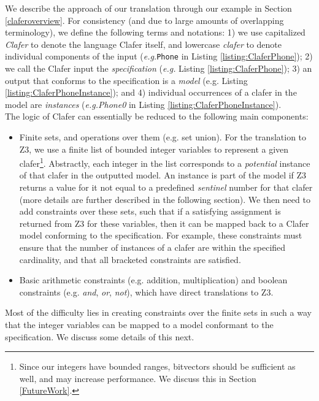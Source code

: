 \documentclass{easychair}
\newcommand{\eg}{\emph{e.g.}\xspace}
\begin{document}
We describe the approach of our translation through our example in Section \ref{claferoverview}. For consistency (and due to large amounts of overlapping terminology), we define the following terms and notations: 1) we use capitalized \textit{Clafer} to denote the language Clafer itself, and lowercase \textit{clafer} to denote individual components of the input (\eg \texttt{Phone} in Listing \ref{listing:ClaferPhone}); 2) we call the Clafer input the \textit{specification} (\eg Listing \ref{listing:ClaferPhone}); 3) an output that conforms to the specification is a \textit{model} (e.g. Listing \ref{listing:ClaferPhoneInstance}); and 4) individual occurrences of a clafer in the model are \textit{instances} (\eg \textit{Phone0} in Listing \ref{listing:ClaferPhoneInstance}). \\
\indent The logic of Clafer can essentially be reduced to the following main components:
\begin{itemize}
\item Finite sets, and operations over them (e.g. set union). For the translation to Z3, we use a finite list of bounded integer variables to represent a given clafer\footnote{Since our integers have bounded ranges,  bitvectors should be sufficient as well, and may increase performance. We discuss this in Section \ref{FutureWork}.}. Abstractly, each integer in the list corresponds to a \textit{potential} instance of that clafer in the outputted model. An instance is part of the model if Z3 returns a value for it not equal to a predefined \textit{sentinel} number for that clafer (more details are further described in the following section). We then need to add constraints over these sets, such that if a satisfying assignment is returned from Z3 for these variables, then it can be mapped back to a Clafer model conforming to the specification. For example, these constraints must ensure that the number of instances of a clafer are within the specified cardinality, and that all bracketed constraints are satisfied.
\item Basic arithmetic constraints (e.g. addition, multiplication) and boolean constraints (e.g. \textit{and}, \textit{or}, \textit{not}), which have direct translations to Z3.
\end{itemize} 

Most of the difficulty lies in creating constraints over the finite sets in such a way that the integer variables can be mapped to a model conformant to the specification. We discuss some details of this next.
\end{document}
